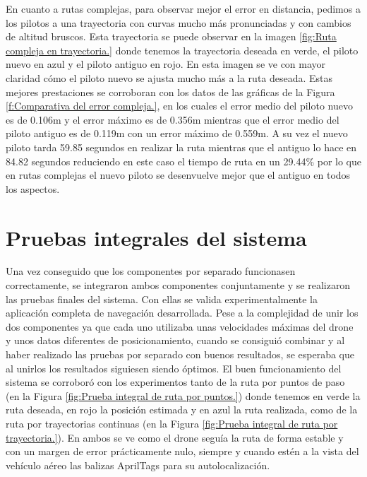 \hspace{1cm} En cuanto a rutas complejas, para observar mejor el error en distancia, pedimos a los pilotos a una trayectoria con curvas mucho más pronunciadas y con cambios de altitud bruscos. Esta trayectoria se puede observar en la imagen \ref{fig:Ruta compleja en trayectoria.} donde tenemos la trayectoria deseada en verde, el piloto nuevo en azul y el piloto antiguo en rojo. En esta imagen se ve con mayor claridad cómo el piloto nuevo se ajusta mucho más a la ruta deseada. Estas mejores prestaciones se corroboran con los datos de las gráficas de la Figura \ref{f:Comparativa del error compleja.}, en los cuales el error medio del piloto nuevo es de 0.106m y el error máximo es de 0.356m mientras que el error medio del piloto antiguo es de 0.119m con un error máximo de 0.559m. A su vez el nuevo piloto tarda 59.85 segundos en realizar la ruta mientras que el antiguo lo hace en 84.82 segundos reduciendo en este caso el tiempo de ruta en un 29.44\% por lo que en rutas complejas el nuevo piloto se desenvuelve mejor que el antiguo en todos los aspectos.

\section{Pruebas integrales del sistema}
\hspace{1cm} Una vez conseguido que los componentes por separado funcionasen correctamente, se integraron ambos componentes conjuntamente y se realizaron las pruebas finales del sistema. Con ellas se valida experimentalmente la aplicación completa de navegación desarrollada. Pese a la complejidad de unir los dos componentes ya que cada uno utilizaba unas velocidades máximas del drone y unos datos diferentes de posicionamiento, cuando se consiguió combinar y al haber realizado las pruebas por separado con buenos resultados, se esperaba que al unirlos los resultados siguiesen siendo óptimos. El buen funcionamiento del sistema se corroboró con los experimentos tanto de la ruta por puntos de paso (en la Figura \ref{fig:Prueba integral de ruta por puntos.}) donde tenemos en verde la ruta deseada, en rojo la posición estimada y en azul la ruta realizada, como de la ruta por trayectorias continuas (en la Figura \ref{fig:Prueba integral de ruta por trayectoria.}). En ambos se ve como el drone seguía la ruta de forma estable y con un margen de error prácticamente nulo, siempre y cuando estén a la vista del vehículo aéreo las balizas AprilTags para su autolocalización. 

